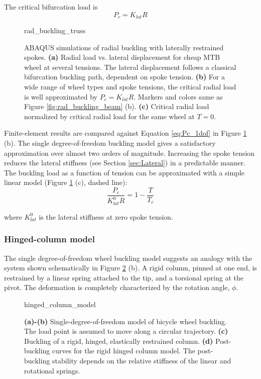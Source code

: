 \documentclass[\rootdir/thesis.tex]{subfiles}
\begin{document}
The critical bifurcation load is
\begin{equation}
\label{eq:Pc_1dof}
P_c = K_{lat}R
\end{equation}

\begin{figure}[h]
\centering
{rad_buckling_truss} 
\caption{ABAQUS simulations of radial buckling with laterally restrained spokes. \textbf{(a)} Radial load vs. lateral displacement for cheap MTB wheel at several tensions. The lateral displacement follows a classical bifurcation buckling path, dependent on spoke tension. \textbf{(b)} For a wide range of wheel types and spoke tensions, the critical radial load is well approximated by $P_c = K_{lat}R$. Markers and colors same as Figure \ref{fig:rad_buckling_beam} (b). \textbf{(c)} Critical radial load normalized by critical radial load for the same wheel at $T=0$.}
\label{fig:rad_buckling_truss}
\end{figure}

Finite-element results are compared against Equation \eqref{eq:Pc_1dof} in Figure \ref{fig:rad_buckling_truss} (b). The single degree-of-freedom buckling model gives a satisfactory approximation over almost two orders of magnitude. Increasing the spoke tension reduces the lateral stiffness (see Section \ref{sec:Lateral}) in a predictable manner. The buckling load as a function of tension can be approximated with a simple linear model (Figure \ref{fig:rad_buckling_truss} (c), dashed line):
\begin{equation}
\label{eq:P_c_T}
\frac{P_c}{K_{lat}^0 R} = 1 - \frac{T}{T_c}
\end{equation}

where $K_{lat}^0$ is the lateral stiffness at zero spoke tension.

\subsubsection{Hinged-column model}

The single degree-of-freedom wheel buckling model suggests an analogy with the system shown schematically in Figure \ref{fig:hinged_column_model} (b). A rigid column, pinned at one end, is restrained by a linear spring attached to the tip, and a torsional spring at the pivot. The deformation is completely characterized by the rotation angle, $\phi$.

\begin{figure}[h]
\centering
{hinged_column_model}
\caption{\textbf{(a)-(b)} Single-degree-of-freedom model of bicycle wheel buckling. The load point is assumed to move along a circular trajectory. \textbf{(c)} Buckling of a rigid, hinged, elastically restrained column. \textbf{(d)} Post-buckling curves for the rigid hinged column model. The post-buckling stability depends on the relative stiffness of the linear and rotational springs.}
\label{fig:hinged_column_model}
\end{figure}
\end{document}

